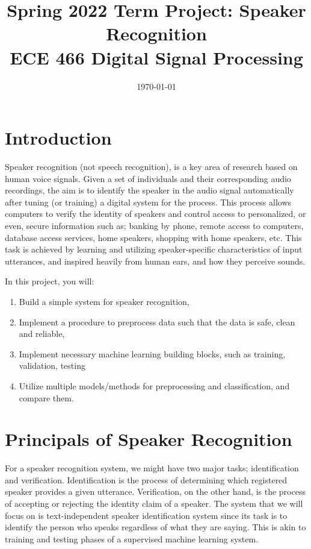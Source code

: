 \documentclass{article}
\title{Spring 2022 Term Project: Speaker Recognition\\ ECE 466 Digital Signal Processing}
\date{\today}
\author{}
\begin{document}
\maketitle

\section{Introduction}
Speaker recognition (not speech recognition), is a key area of research based on human voice signals. Given a set of individuals and their corresponding audio recordings, the aim is to identify the speaker in the audio signal automatically after tuning (or training) a digital system for the process. This process allows computers to verify the identity of speakers and control access to personalized, or even, secure information such as; banking by phone, remote access to computers, database access services, home speakers, shopping with home speakers, etc. This task is achieved by learning and utilizing speaker-specific characteristics of input utterances, and inspired heavily from human ears, and how they perceive sounds.

In this project, you will:
\begin{enumerate}
    \item Build a simple system for speaker recognition,
    \item Implement a procedure to preprocess data such that the data is safe, clean and reliable,
    \item Implement necessary machine learning building blocks, such as training, validation, testing
    \item Utilize multiple models/methods for preprocessing and classification, and compare them.
\end{enumerate}

\section{Principals of Speaker Recognition}
For a speaker recognition system, we might have two major tasks; identification and verification. Identification is the process of determining which registered speaker provides a given utterance. Verification, on the other hand, is the process of accepting or rejecting the identity claim of a speaker. The system that we will focus on is text-independent speaker identification system since its task is to identify the person who speaks regardless of what they are saying. This is akin to training and testing phases of a supervised machine learning system.
\end{document}
